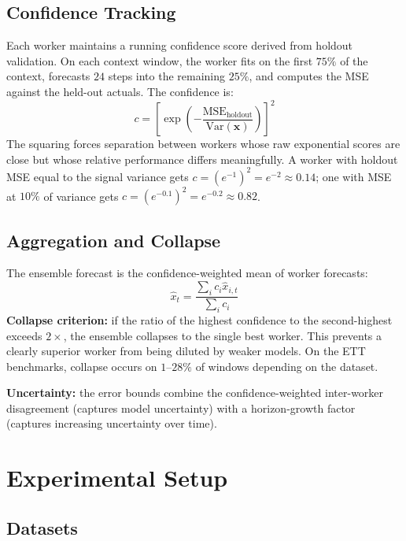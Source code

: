\documentclass[sigconf,nonacm]{acmart}
\begin{document}
\subsection{Confidence Tracking}

Each worker maintains a running confidence score derived from holdout validation. On each context window, the worker fits on the first $75\%$ of the context, forecasts $24$ steps into the remaining $25\%$, and computes the MSE against the held-out actuals. The confidence is:
\begin{equation}
c = \left[\exp\!\left(-\frac{\text{MSE}_{\text{holdout}}}{\text{Var}(\mathbf{x})}\right)\right]^2
\end{equation}
The squaring forces separation between workers whose raw exponential scores are close but whose relative performance differs meaningfully. A worker with holdout MSE equal to the signal variance gets $c = (e^{-1})^2 = e^{-2} \approx 0.14$; one with MSE at $10\%$ of variance gets $c = (e^{-0.1})^2 = e^{-0.2} \approx 0.82$.

\subsection{Aggregation and Collapse}

The ensemble forecast is the confidence-weighted mean of worker forecasts:
\begin{equation}
\hat{x}_t = \frac{\sum_i c_i \hat{x}_{i,t}}{\sum_i c_i}
\end{equation}
\textbf{Collapse criterion:} if the ratio of the highest confidence to the second-highest exceeds $2\times$, the ensemble collapses to the single best worker. This prevents a clearly superior worker from being diluted by weaker models. On the ETT benchmarks, collapse occurs on $1$--$28\%$ of windows depending on the dataset.

\textbf{Uncertainty:} the error bounds combine the confidence-weighted inter-worker disagreement (captures model uncertainty) with a horizon-growth factor (captures increasing uncertainty over time).

\section{Experimental Setup}

\subsection{Datasets}
\end{document}
